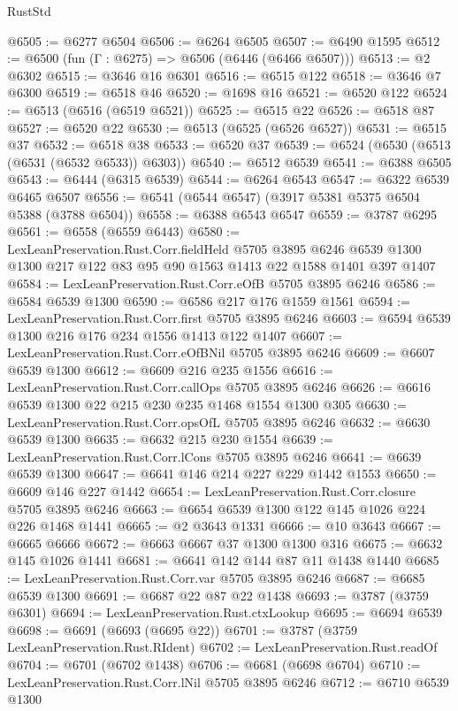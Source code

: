 \begin{lexlean}{RustStd}
\begin{coremodule}
@6505 := @6277 @6504
@6506 := @6264 @6505
@6507 := @6490 @1595
@6512 := @6500 (fun (Γ : @6275) => @6506 (@6446 (@6466 @6507)))
@6513 := @2 @6302
@6515 := @3646 @16 @6301
@6516 := @6515 @122
@6518 := @3646 @7 @6300
@6519 := @6518 @46
@6520 := @1698 @16
@6521 := @6520 @122
@6524 := @6513 (@6516 (@6519 @6521))
@6525 := @6515 @22
@6526 := @6518 @87
@6527 := @6520 @22
@6530 := @6513 (@6525 (@6526 @6527))
@6531 := @6515 @37
@6532 := @6518 @38
@6533 := @6520 @37
@6539 := @6524 (@6530 (@6513 (@6531 (@6532 @6533)) @6303))
@6540 := @6512 @6539
@6541 := @6388 @6505
@6543 := @6444 (@6315 @6539)
@6544 := @6264 @6543
@6547 := @6322 @6539 @6465 @6507
@6556 := @6541 (@6544 @6547) (@3917 @5381 @5375 @6504 @5388 (@3788 @6504))
@6558 := @6388 @6543 @6547
@6559 := @3787 @6295
@6561 := @6558 (@6559 @6443)
@6580 := LexLeanPreservation.Rust.Corr.fieldHeld
    @5705
    @3895
    @6246
    @6539
    @1300
    @1300
    @217
    @122
    @83
    @95
    @90
    @1563
    @1413
    @22
    @1588
    @1401
    @397
    @1407
@6584 := LexLeanPreservation.Rust.Corr.eOfB @5705 @3895 @6246
@6586 := @6584 @6539 @1300
@6590 := @6586 @217 @176 @1559 @1561
@6594 := LexLeanPreservation.Rust.Corr.first @5705 @3895 @6246
@6603 := @6594 @6539 @1300 @216 @176 @234 @1556 @1413 @122 @1407
@6607 := LexLeanPreservation.Rust.Corr.eOfBNil @5705 @3895 @6246
@6609 := @6607 @6539 @1300
@6612 := @6609 @216 @235 @1556
@6616 := LexLeanPreservation.Rust.Corr.callOps @5705 @3895 @6246
@6626 := @6616 @6539 @1300 @22 @215 @230 @235 @1468 @1554 @1300 @305
@6630 := LexLeanPreservation.Rust.Corr.opsOfL @5705 @3895 @6246
@6632 := @6630 @6539 @1300
@6635 := @6632 @215 @230 @1554
@6639 := LexLeanPreservation.Rust.Corr.lCons @5705 @3895 @6246
@6641 := @6639 @6539 @1300
@6647 := @6641 @146 @214 @227 @229 @1442 @1553
@6650 := @6609 @146 @227 @1442
@6654 := LexLeanPreservation.Rust.Corr.closure @5705 @3895 @6246
@6663 := @6654 @6539 @1300 @122 @145 @1026 @224 @226 @1468 @1441
@6665 := @2 @3643 @1331
@6666 := @10 @3643
@6667 := @6665 @6666
@6672 := @6663 @6667 @37 @1300 @1300 @316
@6675 := @6632 @145 @1026 @1441
@6681 := @6641 @142 @144 @87 @11 @1438 @1440
@6685 := LexLeanPreservation.Rust.Corr.var @5705 @3895 @6246
@6687 := @6685 @6539 @1300
@6691 := @6687 @22 @87 @22 @1438
@6693 := @3787 (@3759 @6301)
@6694 := LexLeanPreservation.Rust.ctxLookup
@6695 := @6694 @6539
@6698 := @6691 (@6693 (@6695 @22))
@6701 := @3787 (@3759 LexLeanPreservation.Rust.RIdent)
@6702 := LexLeanPreservation.Rust.readOf
@6704 := @6701 (@6702 @1438)
@6706 := @6681 (@6698 @6704)
@6710 := LexLeanPreservation.Rust.Corr.lNil @5705 @3895 @6246
@6712 := @6710 @6539 @1300

\end{coremodule}
\end{lexlean}
